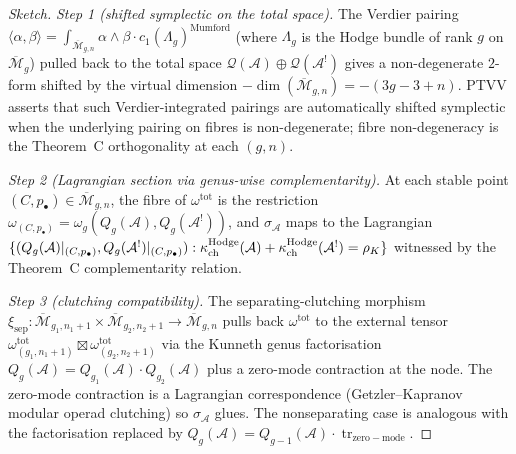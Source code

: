 \begin{proof}[Sketch]
\textit{Step 1 (shifted symplectic on the total space).} The
Verdier pairing
$\langle \alpha, \beta \rangle = \int_{\overline{\mathcal{M}}_{g,n}}
 \alpha \wedge \beta \cdot c_1(\Lambda_g)^{\mathrm{Mumford}}$
(where $\Lambda_g$ is the Hodge bundle of rank $g$ on
$\overline{\mathcal{M}}_g$) pulled back to the total space
$\mathcal{Q}(\mathcal{A}) \oplus \mathcal{Q}(\mathcal{A}^!)$ gives
a non-degenerate $2$-form shifted by the virtual dimension
$-\dim(\overline{\mathcal{M}}_{g,n}) = -(3g{-}3{+}n)$. PTVV
\cite[Thm~2.5]{PTVV13} asserts that such Verdier-integrated
pairings are automatically shifted symplectic when the underlying
pairing on fibres is non-degenerate; fibre non-degeneracy is the
Theorem~C orthogonality at each $(g, n)$.

\textit{Step 2 (Lagrangian section via genus-wise complementarity).}
At each stable point $(C, p_\bullet) \in
\overline{\mathcal{M}}_{g,n}$, the fibre of
$\omega^{\mathrm{tot}}$ is the restriction
$\omega_{(C,p_\bullet)} = \omega_g(Q_g(\mathcal{A}),
Q_g(\mathcal{A}^!))$, and $\sigma_{\mathcal{A}}$ maps to the
Lagrangian
$\{(Q_g(\mathcal{A})|_{(C,p_\bullet)},
 Q_g(\mathcal{A}^!)|_{(C,p_\bullet)})
 : \kappa_{\mathrm{ch}}^{\mathrm{Hodge}}(\mathcal{A}) + \kappa_{\mathrm{ch}}^{\mathrm{Hodge}}(\mathcal{A}^!) = \rho_K\}$
witnessed by the Theorem~C complementarity relation.

\textit{Step 3 (clutching compatibility).} The separating-clutching
morphism $\xi_{\mathrm{sep}}\colon
\overline{\mathcal{M}}_{g_1,n_1+1} \times
\overline{\mathcal{M}}_{g_2,n_2+1} \to
\overline{\mathcal{M}}_{g,n}$ pulls back $\omega^{\mathrm{tot}}$ to
the external tensor $\omega^{\mathrm{tot}}_{(g_1,n_1+1)} \boxtimes
\omega^{\mathrm{tot}}_{(g_2,n_2+1)}$ via the Kunneth genus
factorisation
$Q_g(\mathcal{A}) = Q_{g_1}(\mathcal{A}) \cdot
Q_{g_2}(\mathcal{A})$ plus a zero-mode contraction at the node.
The zero-mode contraction is a Lagrangian correspondence (Getzler--Kapranov
modular operad clutching) so $\sigma_{\mathcal{A}}$ glues. The
nonseparating case is analogous with the factorisation replaced by
$Q_g(\mathcal{A}) = Q_{g-1}(\mathcal{A}) \cdot
\operatorname{tr}_{\mathrm{zero-mode}}$.
\end{proof}

